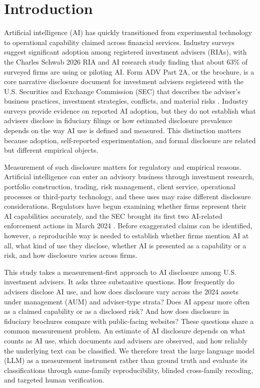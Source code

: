 \documentclass[utf8]{FrontiersinHarvard}
\begin{document}
\section{Introduction}

Artificial intelligence (AI) has quickly transitioned from experimental technology to operational capability claimed across financial services. Industry surveys suggest significant adoption among registered investment advisers (RIAs), with the Charles Schwab 2026 RIA and AI research study \citep{schwab2026} finding that about 63\% of surveyed firms are using or piloting AI. Form ADV Part 2A, or the brochure, is a core narrative disclosure document for investment advisers registered with the U.S. Securities and Exchange Commission (SEC) that describes the adviser's business practices, investment strategies, conflicts, and material risks \citep{usSEC2019}. Industry surveys provide evidence on reported AI adoption, but they do not establish what advisers disclose in fiduciary filings or how estimated disclosure prevalence depends on the way AI use is defined and measured. This distinction matters because adoption, self-reported experimentation, and formal disclosure are related but different empirical objects.

Measurement of such disclosure matters for regulatory and empirical reasons. Artificial intelligence can enter an advisory business through investment research, portfolio construction, trading, risk management, client service, operational processes or third-party technology, and these uses may raise different disclosure considerations. Regulators have begun examining whether firms represent their AI capabilities accurately, and the SEC brought its first two AI-related enforcement actions in March 2024 \citep{usSEC2024a,usSEC2024b}. Before exaggerated claims can be identified, however, a reproducible way is needed to establish whether firms mention AI at all, what kind of use they disclose, whether AI is presented as a capability or a risk, and how disclosure varies across firms.

This study takes a measurement-first approach to AI disclosure among U.S. investment advisers. It asks three substantive questions. How frequently do advisers disclose AI use, and how does disclosure vary across the 2024 assets under management (AUM) and adviser-type strata? Does AI appear more often as a claimed capability or as a disclosed risk? And how does disclosure in fiduciary brochures compare with public-facing websites? These questions share a common measurement problem. An estimate of AI disclosure depends on what counts as AI use, which documents and advisers are observed, and how reliably the underlying text can be classified. We therefore treat the large language model (LLM) as a measurement instrument rather than ground truth and evaluate its classifications through same-family reproducibility, blinded cross-family recoding, and targeted human verification.
\end{document}
